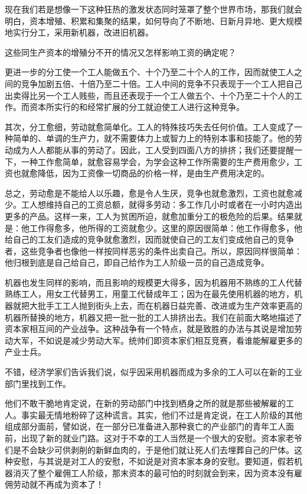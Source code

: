 \documentclass[a4paper,twoside,12pt]{ctexart}
\begin{document}
现在我们若是想像一下这种狂热的激发状态同时笼罩了整个世界市场，那我们就会明白，资本增殖、积累和集聚的结果，如何导向了不断地、日新月异地、更大规模地实行分工，采用新机器，改进旧机器。

这些同生产资本的增殖分不开的情况又怎样影响工资的确定呢？

更进一步的分工使一个工人能做五个、十个乃至二十个人的工作，因而就使工人之间的竞争加剧五倍、十倍乃至二十倍。工人中间的竞争不只表现于一个工人把自己出卖得比另一个工人贱些，而且还表现于一个工人做五个、十个乃至二十个人的工作。而资本所实行的和经常扩展的分工就迫使工人进行这种竞争。

其次，分工愈细，劳动就愈简单化。工人的特殊技巧失去任何价值。工人变成了一种简单的、单调的生产力，就不需要体力上或智力上的特别本事和技能了。他的劳动成为人人都能从事的劳动了。因此，工人受到四面八方的排挤；我们还要提醒一下，一种工作愈简单，就愈容易学会，为学会这种工作所需要的生产费用愈少，工资也就愈降低，因为工资像一切商品的价格一样，是由生产费用决定的。

总之，劳动愈是不能给人以乐趣，愈是令人生厌，竞争也就愈激烈，工资也就愈减少。工人想维持自己的工资总额，就得多劳动：多工作几小时或者在一小时内造出更多的产品。这样一来，工人为贫困所迫，就愈加重分工的极危险的后果。结果就是：他工作得愈多，他所得的工资就愈少。这里的原因很简单：他工作得愈多，他给自己的工友们造成的竞争就愈激烈，因而就使自己的工友们变成他自己的竞争者，这些竞争者也像他一样按同样恶劣的条件出卖自己。所以，原因同样很简单：他归根到底是自己给自己，即自己给作为工人阶级一员的自己造成竞争。

机器也发生同样的影响，而且影响的规模更大得多，因为机器用不熟练的工人代替熟练工人，用女工代替男工，用童工代替成年工；因为在最先使用机器的地方，机器就把大批手工工人抛到街头上去，而在机器日益完善、改进或为生产效率更高的机器所替换的地方，机器又把一批一批的工人排挤出去。我们在前面大略地描述了资本家相互间的产业战争。这种战争有一个特点，就是致胜的办法与其说是增加劳动大军，不如说是减少劳动大军。统帅们即资本家们相互竞赛，看谁能解雇更多的产业士兵。

不错，经济学家们告诉我们说，似乎因采用机器而成为多余的工人可以在新的工业部门里找到工作。

他们不敢干脆地肯定说，在新的劳动部门中找到栖身之所的就是那些被解雇的工人。事实最无情地粉碎了这种谎言。其实，他们不过是肯定说，在工人阶级的其他组成部分面前，譬如说，在一部分已准备进入那种衰亡的产业部门的青年工人面前，出现了新的就业门路。这对于不幸的工人当然是一个很大的安慰。资本家老爷们是不会缺少可供剥削的新鲜血肉的，于是他们就让死人们去埋葬自己的尸体。这种安慰，与其说是对工人的安慰，不如说是对资本家本身的安慰。要知道，假若机器消灭了整个雇佣工人阶级，那末资本的最可怕的时刻就会到来，因为资本没有雇佣劳动就不再成为资本了！
\end{document}
